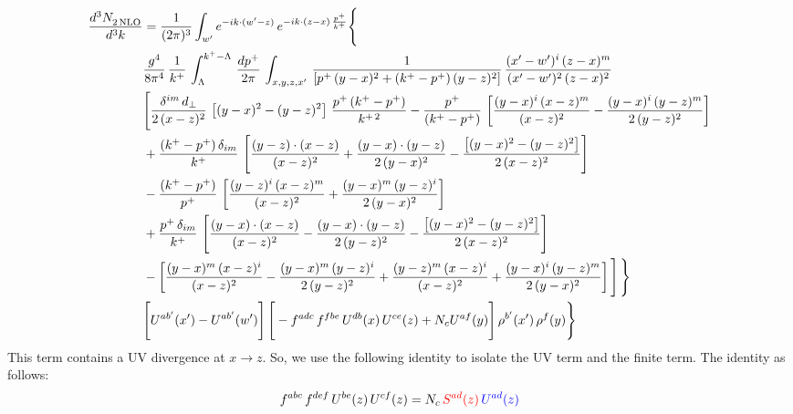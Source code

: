 \documentclass[9pt]{article}
\numberwithin{equation}{section}
\begin{document}
\begin{align}
    \frac{d^{3}N_{2\,\rm NLO}^{\rm}}{d^{3}k}  & =  \frac{1}{(2\pi)^{3}}  \int_{ w^\prime} e^{-ik\cdot(w'-z)}\,e^{-ik\cdot (z-x)\,\frac{p^{+}}{k^{+}}} \Bigg\{\notag \\ & \frac{g^{4}}{8\pi^{4}}\,\frac{1}{k^{+}}\,\int_{\Lambda}^{k^{+}-\Lambda}\, \frac{dp^{+}}{2\pi} \, \int_{x,y,z,x'}\,\frac{1}{\left[p^{+}\,(y-x)^{2}+(k^{+}-p^{+})\,(y-z)^{2}\right]}\, \frac{(x'-w')^{i}\,(z-x)^{m}}{(x'-w')^{2}\,(z-x)^{2}} \notag \\ & \Bigg[\frac{\delta^{im}\,d_{\perp}}{2\,(x-z)^{2}}\,\left[(y-x)^{2}-(y-z)^{2}\right]\,\frac{p^{+}\,(k^{+}-p^{+})}{k^{+\,2}}-\frac{p^{+}}{(k^{+}-p^{+})}\,\left[\frac{(y-x)^{i}\,(x-z)^{m}}{(x-z)^{2}}-\frac{(y-x)^{i}\,(y-z)^{m}}{2\,(y-z)^{2}}\right]\notag \\ & +\frac{(k^{+}-p^{+})\,\delta_{im}}{k^{+}}\,\left[\frac{(y-z)\cdot (x-z)}{(x-z)^{2}}+\frac{(y-x)\cdot (y-z)}{2\,(y-x)^{2}}-\frac{\left[(y-x)^{2}-(y-z)^{2}\right]}{2\,(x-z)^{2}}\right]\notag \\ & -\frac{(k^{+}-p^{+})}{p^{+}}\,\left[\frac{(y-z)^{i}\,(x-z)^{m}}{(x-z)^{2}}+\frac{(y-x)^{m}\,(y-z)^{i}}{2\,(y-x)^{2}}\right]\notag \\ & +\frac{p^{+}\,\delta_{im}}{k^{+}}\,\left[\frac{(y-x)\cdot (x-z)}{(x-z)^{2}}-\frac{(y-x)\cdot (y-z)}{2\,(y-z)^{2}}-\frac{\left[(y-x)^{2}-(y-z)^{2}\right]}{2\,(x-z)^{2}}\right]\notag \\ &-\left[\frac{(y-x)^{m}\,(x-z)^{i}}{(x-z)^{2}}-\frac{(y-x)^{m}\,(y-z)^{i}}{2\,(y-z)^{2}}+\frac{(y-z)^{m}\,(x-z)^{i}}{(x-z)^{2}}+\frac{(y-x)^{i}\,(y-z)^{m}}{2\,(y-x)^{2}}\right]\Bigg]\,\Bigg\} \notag \\ & \Bigg[U^{ab'}(x')-U^{ab'}(w')\Bigg]\,\Bigg[-f^{adc}\,f^{fbe}\,U^{db}(x)\,U^{ce}(z)+N_{c}U^{af}(y)\Bigg]\,\rho^{b'}(x')\,\rho^{f}(y)\Bigg\}
\end{align}
This term contains a UV divergence at $x\rightarrow z$.  So, we use the following identity to isolate the UV term and the finite term. The identity as follows:
$$f^{abc}\,f^{def}\,U^{be}(z)\,U^{cf}(z) = N_{c}\,{\color{red}S^{ad}(z)}\,{\color{blue}U^{ad}(z)}$$
\end{document}
